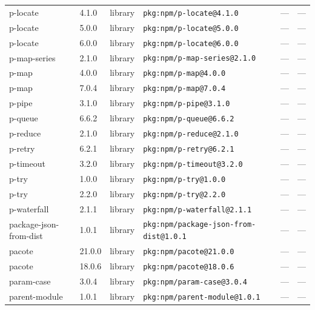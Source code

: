 \documentclass[11pt,a4paper]{article}
\begin{document}
\begin{longtable}{|p{4cm}|p{2cm}|p{1.6cm}|p{5cm}|p{1.5cm}|p{3.5cm}|}
\raggedright p-locate & 4.1.0 & library & \small\texttt{pkg:npm/p-locate@4.1.0} & — & \small — \\
\raggedright p-locate & 5.0.0 & library & \small\texttt{pkg:npm/p-locate@5.0.0} & — & \small — \\
\raggedright p-locate & 6.0.0 & library & \small\texttt{pkg:npm/p-locate@6.0.0} & — & \small — \\
\raggedright p-map-series & 2.1.0 & library & \small\texttt{pkg:npm/p-map-series@2.1.0} & — & \small — \\
\raggedright p-map & 4.0.0 & library & \small\texttt{pkg:npm/p-map@4.0.0} & — & \small — \\
\raggedright p-map & 7.0.4 & library & \small\texttt{pkg:npm/p-map@7.0.4} & — & \small — \\
\raggedright p-pipe & 3.1.0 & library & \small\texttt{pkg:npm/p-pipe@3.1.0} & — & \small — \\
\raggedright p-queue & 6.6.2 & library & \small\texttt{pkg:npm/p-queue@6.6.2} & — & \small — \\
\raggedright p-reduce & 2.1.0 & library & \small\texttt{pkg:npm/p-reduce@2.1.0} & — & \small — \\
\raggedright p-retry & 6.2.1 & library & \small\texttt{pkg:npm/p-retry@6.2.1} & — & \small — \\
\raggedright p-timeout & 3.2.0 & library & \small\texttt{pkg:npm/p-timeout@3.2.0} & — & \small — \\
\raggedright p-try & 1.0.0 & library & \small\texttt{pkg:npm/p-try@1.0.0} & — & \small — \\
\raggedright p-try & 2.2.0 & library & \small\texttt{pkg:npm/p-try@2.2.0} & — & \small — \\
\raggedright p-waterfall & 2.1.1 & library & \small\texttt{pkg:npm/p-waterfall@2.1.1} & — & \small — \\
\raggedright package-json-from-dist & 1.0.1 & library & \small\texttt{pkg:npm/package-json-from-dist@1.0.1} & — & \small — \\
\raggedright pacote & 21.0.0 & library & \small\texttt{pkg:npm/pacote@21.0.0} & — & \small — \\
\raggedright pacote & 18.0.6 & library & \small\texttt{pkg:npm/pacote@18.0.6} & — & \small — \\
\raggedright param-case & 3.0.4 & library & \small\texttt{pkg:npm/param-case@3.0.4} & — & \small — \\
\raggedright parent-module & 1.0.1 & library & \small\texttt{pkg:npm/parent-module@1.0.1} & — & \small — \\

\end{longtable}
\end{document}
